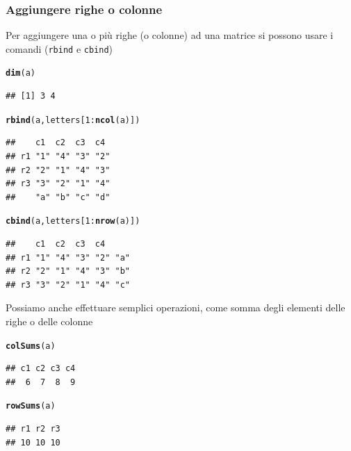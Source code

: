 \documentclass[onecolumn,12pt]{book}\usepackage[]{graphicx}\usepackage[]{color}
\makeatletter
\newcommand{\hlnum}[1]{\textcolor[rgb]{0.686,0.059,0.569}{#1}}%
\newcommand{\hlopt}[1]{\textcolor[rgb]{0,0,0}{#1}}%
\newcommand{\hlstd}[1]{\textcolor[rgb]{0.345,0.345,0.345}{#1}}%
\newcommand{\hlkwd}[1]{\textcolor[rgb]{0.737,0.353,0.396}{\textbf{#1}}}%
\newenvironment{kframe}{%
 \def\at@end@of@kframe{}%
 \ifinner\ifhmode%
  \def\at@end@of@kframe{\end{minipage}}%
  \begin{minipage}{\columnwidth}%
 \fi\fi%
 \def\FrameCommand##1{\hskip\@totalleftmargin \hskip-\fboxsep
 \colorbox{shadecolor}{##1}\hskip-\fboxsep
     \hskip-\linewidth \hskip-\@totalleftmargin \hskip\columnwidth}%
 \MakeFramed {\advance\hsize-\width
   \@totalleftmargin\z@ \linewidth\hsize
   \@setminipage}}%
 {\par\unskip\endMakeFramed%
 \at@end@of@kframe}
\newenvironment{knitrout}{}{} %
\makeatother
\begin{document}
\subsubsection{Aggiungere righe o colonne}
Per aggiungere una o pi\`u righe (o colonne)
ad una matrice si possono usare i comandi (\texttt{rbind} e \texttt{cbind})
\begin{knitrout}
\color{fgcolor}\begin{kframe}
\begin{alltt}
\hlkwd{dim}\hlstd{(a)}
\end{alltt}
\begin{verbatim}
## [1] 3 4
\end{verbatim}
\begin{alltt}
\hlkwd{rbind}\hlstd{(a,letters[}\hlnum{1}\hlopt{:}\hlkwd{ncol}\hlstd{(a)])}
\end{alltt}
\begin{verbatim}
##    c1  c2  c3  c4 
## r1 "1" "4" "3" "2"
## r2 "2" "1" "4" "3"
## r3 "3" "2" "1" "4"
##    "a" "b" "c" "d"
\end{verbatim}
\begin{alltt}
\hlkwd{cbind}\hlstd{(a,letters[}\hlnum{1}\hlopt{:}\hlkwd{nrow}\hlstd{(a)])}
\end{alltt}
\begin{verbatim}
##    c1  c2  c3  c4     
## r1 "1" "4" "3" "2" "a"
## r2 "2" "1" "4" "3" "b"
## r3 "3" "2" "1" "4" "c"
\end{verbatim}
\end{kframe}
\end{knitrout}
Possiamo anche effettuare semplici operazioni, come somma degli elementi delle righe o delle colonne
\begin{knitrout}
\color{fgcolor}\begin{kframe}
\begin{alltt}
\hlkwd{colSums}\hlstd{(a)}
\end{alltt}
\begin{verbatim}
## c1 c2 c3 c4 
##  6  7  8  9
\end{verbatim}
\begin{alltt}
\hlkwd{rowSums}\hlstd{(a)}
\end{alltt}
\begin{verbatim}
## r1 r2 r3 
## 10 10 10
\end{verbatim}
\end{kframe}
\end{knitrout}
\end{document}
